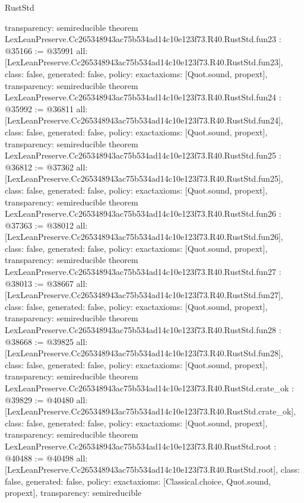 \begin{lexlean}{RustStd}
\begin{coremodule}
{  transparency: semireducible
}
theorem LexLeanPreserve.Cc265348943ac75b534ad14c10e123f73.R40.RustStd.fun23 : @35166 := @35991 {
  all: [LexLeanPreserve.Cc265348943ac75b534ad14c10e123f73.R40.RustStd.fun23],
  class: false,
  generated: false,
  policy: exact{axioms: [Quot.sound, propext]},
  transparency: semireducible
}
theorem LexLeanPreserve.Cc265348943ac75b534ad14c10e123f73.R40.RustStd.fun24 : @35992 := @36811 {
  all: [LexLeanPreserve.Cc265348943ac75b534ad14c10e123f73.R40.RustStd.fun24],
  class: false,
  generated: false,
  policy: exact{axioms: [Quot.sound, propext]},
  transparency: semireducible
}
theorem LexLeanPreserve.Cc265348943ac75b534ad14c10e123f73.R40.RustStd.fun25 : @36812 := @37362 {
  all: [LexLeanPreserve.Cc265348943ac75b534ad14c10e123f73.R40.RustStd.fun25],
  class: false,
  generated: false,
  policy: exact{axioms: [Quot.sound, propext]},
  transparency: semireducible
}
theorem LexLeanPreserve.Cc265348943ac75b534ad14c10e123f73.R40.RustStd.fun26 : @37363 := @38012 {
  all: [LexLeanPreserve.Cc265348943ac75b534ad14c10e123f73.R40.RustStd.fun26],
  class: false,
  generated: false,
  policy: exact{axioms: [Quot.sound, propext]},
  transparency: semireducible
}
theorem LexLeanPreserve.Cc265348943ac75b534ad14c10e123f73.R40.RustStd.fun27 : @38013 := @38667 {
  all: [LexLeanPreserve.Cc265348943ac75b534ad14c10e123f73.R40.RustStd.fun27],
  class: false,
  generated: false,
  policy: exact{axioms: [Quot.sound, propext]},
  transparency: semireducible
}
theorem LexLeanPreserve.Cc265348943ac75b534ad14c10e123f73.R40.RustStd.fun28 : @38668 := @39825 {
  all: [LexLeanPreserve.Cc265348943ac75b534ad14c10e123f73.R40.RustStd.fun28],
  class: false,
  generated: false,
  policy: exact{axioms: [Quot.sound, propext]},
  transparency: semireducible
}
theorem LexLeanPreserve.Cc265348943ac75b534ad14c10e123f73.R40.RustStd.crate_ok : @39829 := @40480 {
  all: [LexLeanPreserve.Cc265348943ac75b534ad14c10e123f73.R40.RustStd.crate_ok],
  class: false,
  generated: false,
  policy: exact{axioms: [Quot.sound, propext]},
  transparency: semireducible
}
theorem LexLeanPreserve.Cc265348943ac75b534ad14c10e123f73.R40.RustStd.root : @40488 := @40498 {
  all: [LexLeanPreserve.Cc265348943ac75b534ad14c10e123f73.R40.RustStd.root],
  class: false,
  generated: false,
  policy: exact{axioms: [Classical.choice, Quot.sound, propext]},
  transparency: semireducible
}


\end{coremodule}
\end{lexlean}
